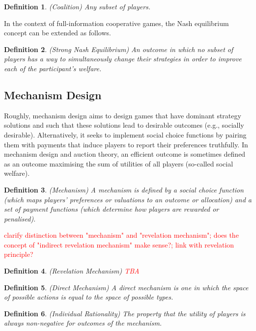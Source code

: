 \documentclass{article}
\newtheorem{definition}{Definition}
\begin{document}
\begin{definition}
(Coalition) Any subset of players.
\end{definition}

In the context of full-information cooperative games, the Nash equilibrium concept can be extended as follows.

\begin{definition}
(Strong Nash Equilibrium) An outcome in which no subset of players has a way to simultaneously change their strategies in order to improve each of the participant's welfare.
\end{definition}

\subsection{Mechanism Design}

Roughly, mechanism design aims to design games that have dominant strategy solutions and such that these solutions lead to desirable outcomes (e.g., socially desirable). Alternatively, it seeks to implement social choice functions by pairing them with payments that induce players to report their preferences truthfully. In mechanism design and auction theory, an efficient outcome is sometimes defined as an outcome maximising the sum of utilities of all players (so-called social welfare).

\begin{definition}
(Mechanism) A mechanism is defined by a social choice function (which maps players' preferences or valuations to an outcome or allocation) and a set of payment functions (which determine how players are rewarded or penalised).
\end{definition}

\textcolor{red}{clarify distinction between "mechanism" and "revelation mechanism"; does the concept of "indirect revelation mechanism" make sense?; link with revelation principle?}

\begin{definition}
(Revelation Mechanism) \textcolor{red}{TBA}
\end{definition}

\begin{definition}
(Direct Mechanism) A direct mechanism is one in which the space of possible actions is equal to the space of possible types.
\end{definition}

\begin{definition}
(Individual Rationality) The property that the utility of players is always non-negative for outcomes of the mechanism.
\end{definition}
\end{document}
